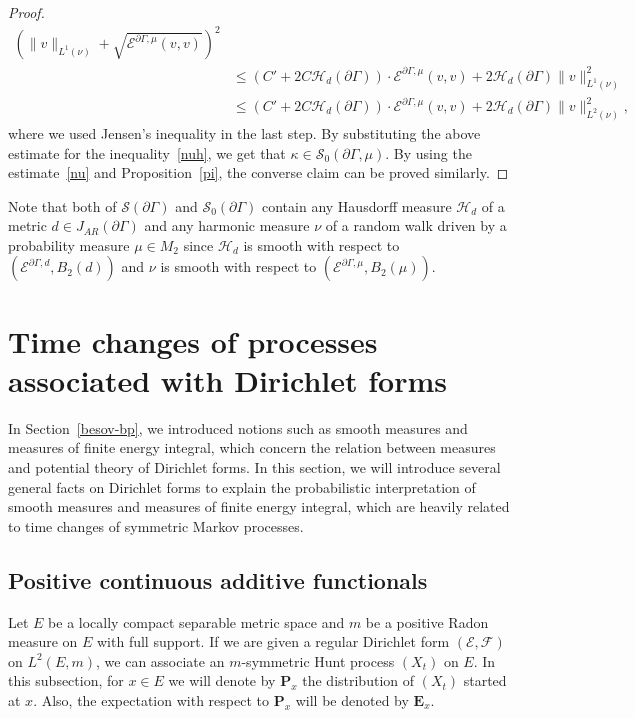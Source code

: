 \documentclass[AHL,Unicode,longabstracts,published]{cedram}
\newcommand{\ce}{\mathcal{E}}
\newcommand{\cf}{\mathcal{F}}
\newcommand{\cs}{\mathcal{S}}
\newcommand{\ch}{\mathcal{H}}
\newcommand{\bfE}{\mathbf{E}}
\newcommand{\bfP}{\mathbf{P}}
\begin{document}
\begin{proof}
\begin{align*}
\left(\|v\|_{L^1(\nu)}+\sqrt{\ce^{\partial\Gamma,\mu}(v,v)}\right)^2\\
&\leq \left(C'+2C\ch_{d}(\partial\Gamma) \right)\cdot \ce^{\partial\Gamma,\mu}(v,v) +2\ch_{d}(\partial\Gamma)\|v\|^2_{L^1(\nu)}\\
&\leq \left(C'+2C\ch_{d}(\partial\Gamma) \right)\cdot \ce^{\partial\Gamma,\mu}(v,v) +2\ch_{d}(\partial\Gamma)\|v\|^2_{L^2(\nu)},
\end{align*}
where we used Jensen's inequality in the last step. By substituting the above estimate for the inequality~\eqref{nuh}, we get that $\kappa\in\cs_0(\partial\Gamma,\mu)$. By using the estimate~\eqref{nu} and Proposition~\ref{pi}, the converse claim can be proved similarly.
\end{proof}


\begin{rema}\label{rem6}
Note that both of $\cs(\partial \Gamma)$ and $\cs_0(\partial\Gamma)$ contain any Hausdorff measure $\ch_{d}$ of a metric $d\in J_{AR}(\partial\Gamma)$ and any harmonic measure $\nu$ of a random walk driven by a probability measure $\mu\in M_2$ since $\ch_{d}$ is smooth with respect to $(\ce^{\partial\Gamma,d},B_2(d))$ and $\nu$ is smooth with respect to $(\ce^{\partial\Gamma,\mu},B_2(\mu))$.
\end{rema}


\section{Time changes of processes associated with Dirichlet forms}\label{time-change}
In Section~\ref{besov-bp}, we introduced notions such as smooth measures and measures of finite energy integral, which concern the relation between measures and potential theory of Dirichlet forms. In this section, we will introduce several general facts on Dirichlet forms to explain the probabilistic interpretation of smooth measures and measures of finite energy integral, which are heavily related to time changes of symmetric Markov processes.



\subsection{Positive continuous additive functionals}\label{ssc:pcaf}



Let $E$ be a locally compact separable metric space and $m$ be a positive Radon measure on $E$ with full support. If we are given a regular Dirichlet form $(\ce,\cf)$ on $L^2(E,m)$, we can associate an $m$-symmetric Hunt process $(X_t)$ on $E$. In this subsection, for $x\in E$ we will denote by $\bfP_x$ the distribution of $(X_t)$ started at $x$. Also, the expectation with respect to $\bfP_x$ will be denoted by $\bfE_x$.
\end{document}
